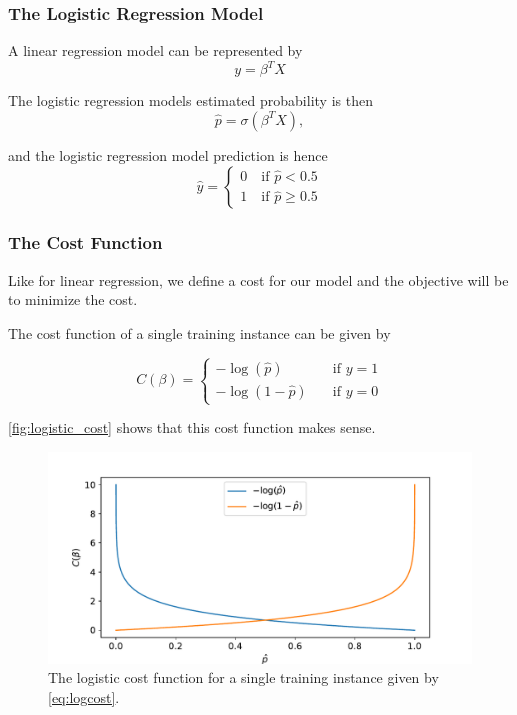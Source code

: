 \subsubsection{The Logistic Regression Model}

A linear regression model can be represented by
\begin{equation}
    y = \beta^T X
\end{equation}

The logistic regression models estimated probability is then
\begin{equation}
    \hat{p} = \sigma (\beta^T X),
\end{equation}

and the logistic regression model prediction is hence
\begin{equation}
\hat{y} = \begin{cases} 0 \quad \text{if } \hat{p} < 0.5 \\ 1 \quad \text{if } \hat{p} \geq 0.5 \end{cases} 
\end{equation}


\subsubsection{The Cost Function}
Like for linear regression, we define a cost for our model and the objective will be to minimize the cost.

The cost function of a single training instance can be given by

\begin{equation}\label{eq:logcost}
    C(\beta) = \begin{cases} - \log(\hat{p}) &\quad \text{if } y=1 \\ - \log(1-\hat{p}) &\quad \text{if } y=0  \end{cases}
\end{equation}

\autoref{fig:logistic_cost} shows that this cost function makes sense.

\begin{figure}[H]
\begin{center}\includegraphics[scale=0.6]{latex/figures/logistic_cost_func.pdf}
\end{center}
\caption{The logistic cost function for a single training instance given by \autoref{eq:logcost}.}
\label{fig:logistic_cost}
\end{figure}

